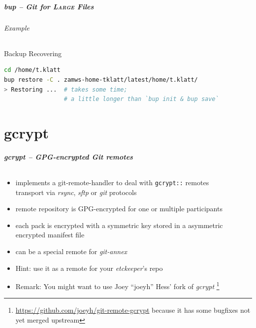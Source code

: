\documentclass[english,hyperref={pdfpagelabels=false},aspectratio=1610]{beamer}
\begin{document}
\begin{frame}[fragile]
  \frametitle{bup -- Git for \textsc{Large} Files}
  \framesubtitle{Example}
  \begin{block}{Backup Recovering}
    \vspace{-0.75em}
    \begin{lstlisting}[language=zsh]
cd /home/t.klatt
bup restore -C . zamws-home-tklatt/latest/home/t.klatt/
> Restoring ...  # takes some time;
                 # a little longer than `bup init & bup save`
    \end{lstlisting}
    \vspace{-0.75em}
  \end{block}
\end{frame}



\part{gcrypt}
\makepart

\begin{frame}[label=gcrypt]
  \frametitle{gcrypt -- GPG-encrypted Git remotes}
  \framesubtitle{}
  \begin{itemize}
    \item implements a git-remote-handler to deal with \texttt{gcrypt::} remotes\\
      {\scriptsize transport via \emph{rsync}, \emph{sftp} or \emph{git} protocols}
    \item remote repository is GPG-encrypted for one or multiple participants
    \item each pack is encrypted with a symmetric key stored in a asymmetric encrypted manifest file
    \item can be a special remote for \textit{git-annex}
    \item Hint: use it as a remote for your \textit{etckeeper}'s repo
    \item \scriptsize\color{fzjgray50}Remark: You might want to use Joey ``joeyh'' Hess' fork of \emph{gcrypt}
      \footnote{\tiny\url{https://github.com/joeyh/git-remote-gcrypt} because it has some bugfixes not yet merged upstream}
  \end{itemize}
\end{frame}
\end{document}
